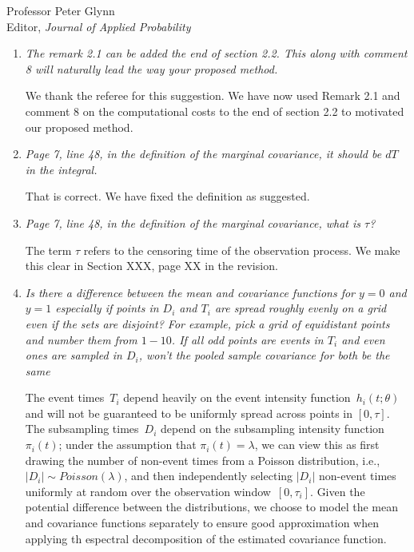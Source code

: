 \documentclass[11pt]{letter} %
\begin{document}
\begin{letter}{Professor
	Peter Glynn\\
	Editor, {\em Journal of Applied Probability}}
\begin{enumerate}
\item{\it The remark 2.1 can be added the end of section 2.2. This along with
comment 8 will naturally lead the way your proposed method.}

\vspace{5mm}
We thank the referee for this suggestion.  We have now used Remark 2.1 and comment 8 on the computational costs to the end of section 2.2 to motivated our proposed method.
\vspace{5mm}

\item {\it Page 7, line 48, in the definition of the marginal covariance, it should be $dT$ in the integral.}

\vspace{5mm}
That is correct.  We have fixed the definition as suggested.
\vspace{5mm}

\item {\it Page 7, line 48, in the definition of the marginal covariance, what is $\tau$?}

\vspace{5mm}
The term $\tau$ refers to the censoring time of the observation process. We make this clear in Section XXX, page XX in the revision.
\vspace{5mm}


\item {\it Is there a difference between the mean and covariance functions for $y = 0$ and $y = 1$ especially if points in $D_i$ and $T_i$ are spread roughly evenly on a grid even if the sets are disjoint? For example, pick a grid of equidistant points and number them from $1-10$. If all odd points are events in $T_i$ and even ones are sampled in $D_i$, won't the pooled sample covariance for both be the same}

\vspace{5mm}
The event times~$T_i$ depend heavily on the event intensity function~$h_i (t;\theta)$ and will not be guaranteed to be uniformly spread across points in $[0,\tau]$.  The subsampling times~$D_i$ depend on the subsampling intensity function~$\pi_i(t)$; under the assumption that $\pi_i (t) = \lambda$, we can view this as first drawing the number of non-event times from a Poisson distribution, i.e., $| D_i | \sim Poisson(\lambda)$, and then independently selecting $|D_i|$ non-event times uniformly at random over the observation window~$[0, \tau_i]$.  Given the potential difference between the distributions, we choose to model the mean and covariance functions separately to ensure good approximation when applying th espectral decomposition of the estimated covariance function.
\vspace{5mm}


\end{enumerate}
\end{letter}
\end{document}

